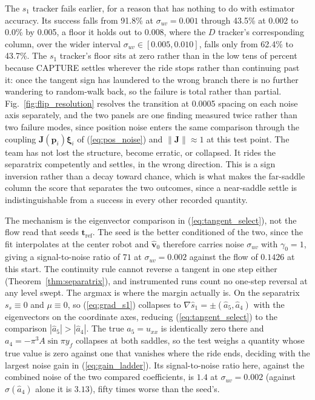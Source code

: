 \documentclass[lettersize,journal]{IEEEtran}
\begin{document}
The $s_1$ tracker fails earlier, for a reason that has nothing to do with
estimator accuracy. Its success
falls from 91.8\% at $\sigma_{uv} = 0.001$ through
43.5\% at 0.002 to 0.0\% by 0.005, a floor it holds out to 0.008, where the
$D$ tracker's corresponding column, over the wider interval
$\sigma_{uv} \in [0.005, 0.010]$, falls only from 62.4\% to 43.7\%. The
$s_1$ tracker's floor sits at zero rather than in the low tens of
percent because CAPTURE settles wherever the ride stops rather than
continuing past it: once the tangent sign has laundered to the wrong
branch there is no further wandering to random-walk back, so the
failure is total rather than partial.
Fig.~\ref{fig:flip_resolution} resolves the transition at 0.0005
spacing on each noise axis separately, and the two panels are one finding
measured twice rather than two failure modes, since position noise enters
the same comparison through the coupling
$\mathbf{J}(\mathbf{p}_i)\boldsymbol{\xi}_i$ of (\ref{eq:pos_noise}) and
$\|\mathbf{J}\| \approx 1$ at this test point. The team has not lost the
structure, become erratic, or
collapsed. It rides the separatrix competently and settles, in the wrong
direction. This is a sign inversion rather than a decay toward chance,
which is what makes the far-saddle column the score that separates the
two outcomes, since a near-saddle settle is indistinguishable from a
success in every other recorded quantity.

The mechanism is the eigenvector comparison in
(\ref{eq:tangent_select}), not the flow read that seeds
$\mathbf{t}_{\text{ref}}$. The seed is the better conditioned of the two,
since the fit interpolates at the center robot and $\hat{\mathbf{v}}_0$
therefore carries noise $\sigma_{uv}$ with $\gamma_0 = 1$, giving a
signal-to-noise ratio of $71$ at $\sigma_{uv} = 0.002$ against the flow
of $0.1426$ at this start. The continuity rule cannot reverse a tangent
in one step either (Theorem~\ref{thm:separatrix}), and instrumented runs
count no one-step reversal at any
level swept. The argmax is where the margin actually is. On the
separatrix $s_s \equiv 0$ and $\mu \equiv 0$, so (\ref{eq:grad_s1})
collapses to $\nabla\hat{s}_1 = \pm(\hat{a}_5, \hat{a}_4)$ with the
eigenvectors on the coordinate axes, reducing
(\ref{eq:tangent_select}) to the comparison $|\hat{a}_5| > |\hat{a}_4|$.
The true $a_5 = u_{xx}$ is identically zero there and $a_4 = -\pi^3 A
\sin \pi y_f$ collapses at both saddles, so the test weighs a quantity
whose true value is zero against one that vanishes where the ride ends,
deciding with the largest noise gain in (\ref{eq:gain_ladder}). Its
signal-to-noise ratio here, against the combined noise of the two
compared coefficients, is $1.4$ at $\sigma_{uv} = 0.002$ (against
$\sigma(\hat{a}_4)$ alone it is $3.13$), fifty times
worse than the seed's.
\end{document}
